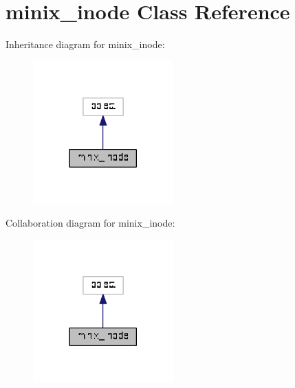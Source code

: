 \hypertarget{classminix__inode_1_1minix__inode}{}\section{minix\+\_\+inode Class Reference}
\label{classminix__inode_1_1minix__inode}


Inheritance diagram for minix\+\_\+inode\+:
\nopagebreak
\begin{figure}[H]
\begin{center}
\leavevmode
\includegraphics[width=153pt]{classminix__inode_1_1minix__inode__inherit__graph}
\end{center}
\end{figure}


Collaboration diagram for minix\+\_\+inode\+:
\nopagebreak
\begin{figure}[H]
\begin{center}
\leavevmode
\includegraphics[width=153pt]{classminix__inode_1_1minix__inode__coll__graph}
\end{center}
\end{figure}
